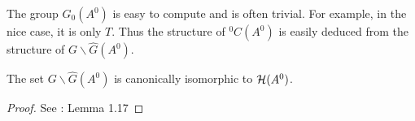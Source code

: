The group $G_0(A^0)$ is easy to compute and is often trivial.
For example, in the nice case, it is only $T$\TODO[correct?].
Thus the structure of ${}^0C(A^0)$ is easily deduced from the structure of
$G\backslash\hat G(A^0)$.

\begin{lem}
  The set $G\backslash\hat G(A^0)$ is canonically isomorphic to $\mathcal{H}(A^0)$.
\end{lem}
\begin{proof}
  See \cite{thboalch}: Lemma 1.17
\end{proof}

